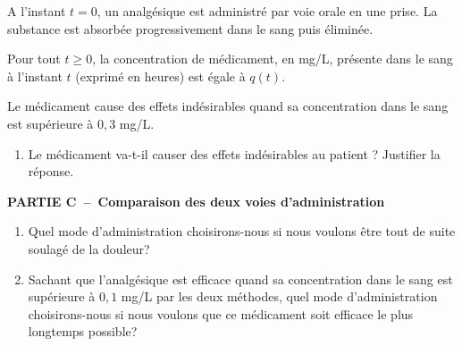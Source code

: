 \begin{exercice_cours}[\quad]{}
A l'instant $t=0$, un analgésique est administré par voie orale en une prise. La substance est absorbée progressivement dans le sang puis éliminée.\par
Pour tout $t \geq 0$, la concentration de médicament, en mg/L, présente dans le sang à l'instant $t$ (exprimé en heures) est égale à $q(t)$.\par
Le médicament cause des effets indésirables quand sa concentration dans le sang est supérieure à $0,3 $ mg/L.

\begin{enumerate}[series=A, resume]
	\item Le médicament va-t-il causer des effets indésirables au patient ? Justifier la réponse.
\end{enumerate}

\medskip

\textbf{PARTIE C~--~Comparaison des deux voies d'administration}

\medskip

\begin{enumerate}[series=A, resume]
	\item Quel mode d'administration choisirons-nous si nous voulons être tout de suite soulagé de la douleur?
	\item Sachant que l'analgésique est efficace quand sa concentration dans le sang est supérieure à $0,1 $ mg/L par les deux méthodes, quel mode d'administration choisirons-nous si nous voulons que
ce médicament soit efficace le plus longtemps possible?
\end{enumerate}
\end{exercice_cours}

\bigskip

